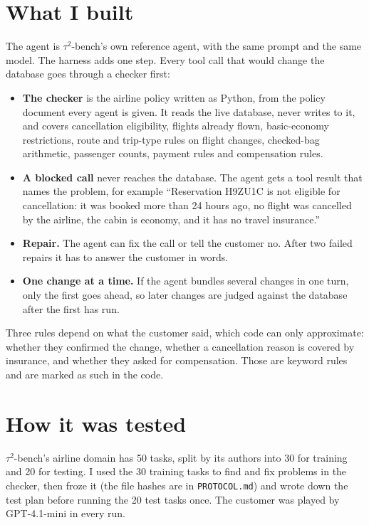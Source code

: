 \documentclass[11pt]{article}
\begin{document}
\section{What I built}

The agent is $\tau^2$-bench's own reference agent, with the same prompt and
the same model. The harness adds one step. Every tool call that would change
the database goes through a checker first:

\begin{itemize}
  \item \textbf{The checker} is the airline policy written as Python, from the
        policy document every agent is given. It reads the live database, never
        writes to it, and covers cancellation eligibility, flights already
        flown, basic-economy restrictions, route and trip-type rules on flight
        changes, checked-bag arithmetic, passenger counts, payment rules and
        compensation rules.
  \item \textbf{A blocked call} never reaches the database. The agent gets a
        tool result that names the problem, for example ``Reservation H9ZU1C is
        not eligible for cancellation: it was booked more than 24 hours ago, no
        flight was cancelled by the airline, the cabin is economy, and it has
        no travel insurance.''
  \item \textbf{Repair.} The agent can fix the call or tell the customer no.
        After two failed repairs it has to answer the customer in words.
  \item \textbf{One change at a time.} If the agent bundles several changes in
        one turn, only the first goes ahead, so later changes are judged
        against the database after the first has run.
\end{itemize}

Three rules depend on what the customer said, which code can only
approximate: whether they confirmed the change, whether a cancellation reason
is covered by insurance, and whether they asked for compensation. Those are
keyword rules and are marked as such in the code.

\section{How it was tested}

$\tau^2$-bench's airline domain has 50 tasks, split by its authors into 30 for
training and 20 for testing. I used the 30 training tasks to find and fix
problems in the checker, then froze it (the file hashes are in
\texttt{PROTOCOL.md}) and wrote down the test plan before running the 20 test
tasks once. The customer was played by GPT-4.1-mini in every run.
\end{document}

